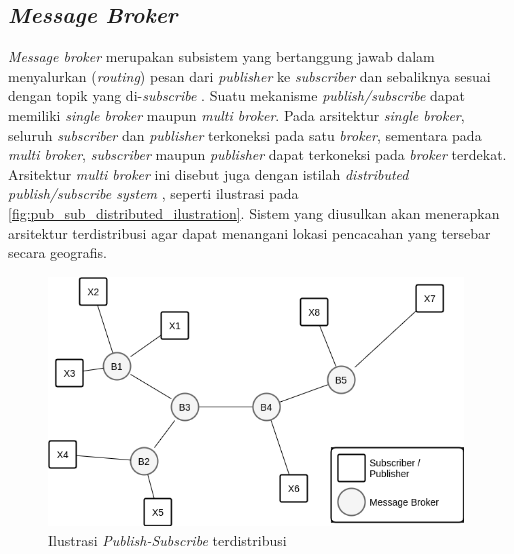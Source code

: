 \subsection{\textit{Message Broker}}
\label{ssec:message-broker}
\textit{Message broker} merupakan subsistem yang bertanggung jawab dalam menyalurkan (\textit{routing}) pesan dari \textit{publisher} ke \textit{subscriber} dan sebaliknya sesuai dengan topik yang di-\textit{subscribe} \citep{banavar_efficient_1999}. Suatu mekanisme \textit{publish/subscribe} dapat memiliki \textit{single broker} maupun \textit{multi broker}. Pada arsitektur \textit{single broker}, seluruh \textit{subscriber} dan \textit{publisher} terkoneksi pada satu \textit{broker}, sementara pada \textit{multi broker}, \textit{subscriber} maupun \textit{publisher} dapat terkoneksi pada \textit{broker} terdekat. Arsitektur \textit{multi broker} ini disebut juga dengan istilah \textit{distributed publish/subscribe system} \citep{muhl_large-scale_2002}, seperti ilustrasi pada \autoref{fig:pub_sub_distributed_ilustration}. Sistem yang diusulkan akan menerapkan arsitektur terdistribusi agar dapat menangani lokasi pencacahan yang tersebar secara geografis.


\begin{figure}[!]
	\centering
	\includegraphics[width=11cm]{Resources/Images/pub_sub_distributed_ilustration}
	\captionsetup{format=hang}
	\caption{Ilustrasi \textit{Publish-Subscribe} terdistribusi}
	\label{fig:pub_sub_distributed_ilustration}
\end{figure}


